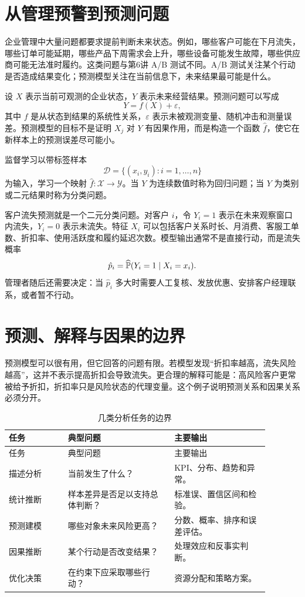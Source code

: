 \documentclass[UTF8,fontset=fandol,openany,zihao=-4]{ctexbook}
\begin{document}
\section{从管理预警到预测问题}

企业管理中大量问题都要求提前判断未来状态。例如，哪些客户可能在下月流失，哪些订单可能延期，哪些产品下周需求会上升，哪些设备可能发生故障，哪些供应商可能无法准时履约。这类问题与第6讲 A/B 测试不同。A/B 测试关注某个行动是否造成结果变化；预测模型关注在当前信息下，未来结果最可能是什么。

设 \(X\) 表示当前可观测的企业状态，\(Y\) 表示未来经营结果。预测问题可以写成
\[
  Y=f(X)+\varepsilon,
\]
其中 \(f\) 是从状态到结果的系统性关系，\(\varepsilon\) 表示未被观测变量、随机冲击和测量误差。预测模型的目标不是证明 \(X_j\) 对 \(Y\) 有因果作用，而是构造一个函数 \(\hat f\)，使它在新样本上的预测误差尽可能小。

\begin{definition}[监督学习]
监督学习以带标签样本
\[
  \mathcal D=\{(x_i,y_i):i=1,\ldots,n\}
\]
为输入，学习一个映射 \(\hat f:\mathcal X\rightarrow \mathcal Y\)。当 \(Y\) 为连续数值时称为回归问题；当 \(Y\) 为类别或二元结果时称为分类问题。
\end{definition}

客户流失预测就是一个二元分类问题。对客户 \(i\)，令 \(Y_i=1\) 表示在未来观察窗口内流失，\(Y_i=0\) 表示未流失。特征 \(X_i\) 可以包括客户关系时长、月消费、客服工单数、折扣率、使用活跃度和履约延迟次数。模型输出通常不是直接行动，而是流失概率
\[
  \hat p_i=\widehat{\mathbb P}(Y_i=1\mid X_i=x_i).
\]
管理者随后还需要决定：当 \(\hat p_i\) 多大时需要人工复核、发放优惠、安排客户经理联系，或者暂不行动。

\section{预测、解释与因果的边界}

预测模型可以很有用，但它回答的问题有限。若模型发现“折扣率越高，流失风险越高”，这并不表示提高折扣会导致流失。更合理的解释可能是：高风险客户更常被给予折扣，折扣率只是风险状态的代理变量。这个例子说明预测关系和因果关系必须分开。

\begin{longtable}{>{\raggedright\arraybackslash}p{0.20\linewidth}>{\raggedright\arraybackslash}p{0.36\linewidth}>{\raggedright\arraybackslash}p{0.32\linewidth}}
\caption{几类分析任务的边界}\\
\toprule
任务 & 典型问题 & 主要输出\\
\midrule
\endfirsthead
\toprule
任务 & 典型问题 & 主要输出\\
\midrule
\endhead
描述分析 & 当前发生了什么？ & KPI、分布、趋势和异常。\\
统计推断 & 样本差异是否足以支持总体判断？ & 标准误、置信区间和检验。\\
预测建模 & 哪些对象未来风险更高？ & 分数、概率、排序和误差评估。\\
因果推断 & 某个行动是否改变结果？ & 处理效应和反事实判断。\\
优化决策 & 在约束下应采取哪些行动？ & 资源分配和策略方案。\\
\bottomrule
\end{longtable}
\end{document}
